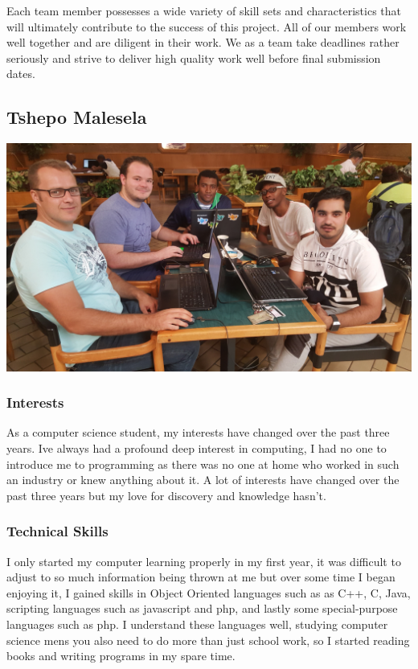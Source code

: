 \documentclass[a4paper,12pt]{article}
\begin{document}
	{\noindent}Each team member possesses a wide variety of skill sets and characteristics that will ultimately contribute to the success of this project. All of our members work well together and are diligent in their work. We as a team take deadlines rather seriously and strive to deliver high quality work well before final submission dates.  
	
		\newpage
		\subsection{Tshepo Malesela}
		\includegraphics[width=1\textwidth]{./Pictures/the_group.jpg}\\
			\subsubsection{Interests}
			As a computer science student, my interests have changed over the past three years. Ive always had a profound deep interest in computing, I had no one to introduce me to programming as there was no one at home who worked in such an industry or knew anything about it. A lot of interests have changed over the past three years but my love for discovery and knowledge hasn't.
			
			\subsubsection{Technical Skills}
			I only started my computer learning properly in  my first year, it was difficult to adjust to so much information being thrown at me but over some time I began enjoying it, I gained skills in Object Oriented languages such as  as C++, C, Java, scripting languages such as javascript and php, and lastly some special-purpose languages such as php. I understand these languages well, studying computer science mens you also need to do more than just school work, so I started reading books and writing programs in my spare time.
			
\end{document}
